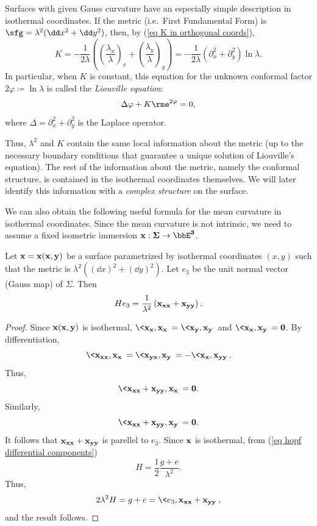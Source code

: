 \begin{example}
    Surfaces with given Gauss curvature have an especially simple description in isothermal coordinates. If the metric (i.e.\ First Fundamental Form) is $\sfg=\lambda^2(\dd x^2+\dd y^2)$, then, by (\ref{eq K in orthogonal coords}),
    \[K=-\frac{1}{2\lambda}\left(\left(\frac{\lambda_x}{\lambda}\right)_x+\left(\frac{\lambda_y}{\lambda}\right)_y \right)=-\frac{1}{2\lambda}(\partial_x^2+\partial_y^2)\ln\lambda.\]
    In particular, when $K$ is constant, this equation for the unknown conformal factor $2\varphi\coloneqq \ln\lambda$ is called the \emph{Liouville equation}:
    \[\Delta \varphi+K\rme^{2\varphi}=0,\label{eq liouville general}\]
    where $\Delta=\partial_x^2+\partial_y^2$ is the Laplace operator.
\end{example}

Thus, $\lambda^2$ and $K$ contain the same local information about the metric (up to the necessary boundary conditions that guarantee a unique solution of Liouville's equation). The rest of the information about the metric, namely the conformal structure, is contained in the isothermal coordinates themselves. We will later identify this information with a \emph{complex structure} on the surface.

We can also obtain the following useful formula for the mean curvature in isothermal coordinates. Since the mean curvature is not intrinsic, we need to assume a fixed isometric immersion $\bf{x}:\Sigma\to \bbE^3$.
\begin{prop}
    Let $\bf{x}=\bf{x}(x,y)$ be a surface parametrized by isothermal coordinates $(x,y)$ such that the metric is $\lambda^2((\dd x)^2+(\dd y)^2)$. Let $e_3$ be the unit normal vector (Gauss map) of $\Sigma$. Then 
    \[H e_3=\frac{1}{\lambda^2}\left(\bf{x}_{xx}+\bf{x}_{yy}\right).\]
\end{prop}
\begin{proof}
    Since $\bf{x}(x,y)$ is isothermal, $\<\bf{x}_x,\bf{x}_x\>=\<\bf{x}_y,\bf{x}_y\>$ and $\<\bf{x}_x,\bf{x}_y\>=0$. By differentiation, 
    \[\<\bf{x}_{xx},\bf{x}_x\>=\<\bf{x}_{yx},\bf{x}_y\>=-\<\bf{x}_x,\bf{x}_{yy}\>.\]
    Thus, 
    \[\<\bf{x}_{xx}+\bf{x}_{yy},\bf{x}_x\>=0.\]
    Similarly, 
    \[\<\bf{x}_{xx}+\bf{x}_{yy},\bf{x}_y\>=0.\]
    It follows that $\bf{x}_{xx}+\bf{x}_{yy}$ is parellel to $e_3$. Since $\bf{x}$ is isothermal, from (\ref{eq hopf differential components})
    \[H=\frac{1}{2}\frac{g+e}{\lambda^2}.\]
    Thus,
    \[2\lambda^2 H=g+e=\<e_3,\bf{x}_{xx}+\bf{x}_{yy}\>,\]
    and the result follows.
\end{proof}


